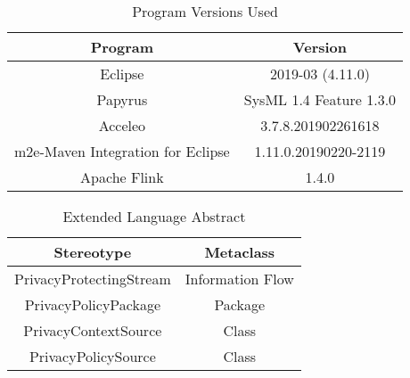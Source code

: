 \begin{table}[h!]
\centering
	\begin{tabular}{||c|c||} 
	\hline\hline
	Program & Version \\ [1ex] 
	\hline\hline
	Eclipse & 2019-03 (4.11.0)  \\
	\hline
	Papyrus & SysML 1.4 Feature 1.3.0  \\
	\hline
	Acceleo & 3.7.8.201902261618  \\
	\hline
	m2e-Maven Integration for Eclipse & 1.11.0.20190220-2119  \\
	\hline
	Apache Flink & 1.4.0  \\
	\hline\hline
	\end{tabular}
\caption{Program Versions Used}
\label{Program Versions Used}
\end{table}

\begin{table}[h!]
\centering
	\begin{tabular}{||c|c||} 
	\hline\hline
	Stereotype & Metaclass \\ [1ex] 
	\hline\hline
	PrivacyProtectingStream & Information Flow  \\
	\hline
	PrivacyPolicyPackage & Package  \\
	\hline
	PrivacyContextSource & Class  \\
	\hline
	PrivacyPolicySource & Class  \\
	\hline\hline
	\end{tabular}
\caption{Extended Language Abstract}
\label{Extended Language Abstract}
\end{table}


